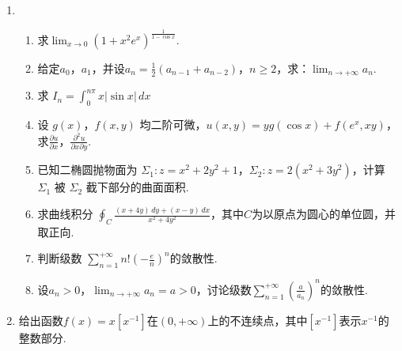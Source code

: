 \documentclass{article}
\begin{document}
\begin{enumerate}
\item
\begin{enumerate}
\item
求$\displaystyle\lim_{x\to 0}\left(1+x^2e^x\right)^{\frac{1}{1-\cos x}}$.
\item
给定$a_0$，$a_1$，并设$\displaystyle a_n=\frac{1}{2}\left(a_{n-1}+a_{n-2}\right)$，$n\ge 2$，求：$\displaystyle \lim_{n\to+\infty}a_n$.
\item
求 $\displaystyle I_n=\int_{0}^{n\pi}x|\sin x|\,dx$
\item
设 $g(x)$，$f(x,y)$ 均二阶可微，$u(x,y)=yg(\cos x)+f(e^x,xy)$，求$\displaystyle \frac{\partial u}{\partial x}$，$\displaystyle\frac{\partial^2 u}{\partial x\partial y}$.
\item
已知二椭圆抛物面为 $\Sigma_1:z=x^2+2y^2+1$，$\Sigma_2:z=2(x^2+3y^2)$，计算 $\Sigma_1$ 被 $\Sigma_2$ 截下部分的曲面面积.
\item
求曲线积分 $\displaystyle \oint_{C}\frac{(x+4y)\,dy+(x-y)\,dx}{x^2+4y^2}$，其中$C$为以原点为圆心的单位圆，并取正向.
\item
判断级数 $\displaystyle \sum_{n=1}^{+\infty}n!\left(-\frac{e}{n}\right)^n$的敛散性.
\item
设$a_n>0$，$\displaystyle \lim_{n\to+\infty}a_n=a>0$，讨论级数$\displaystyle \sum_{n=1}^{+\infty}\left(\frac{a}{a_n}\right)^n$的敛散性.
\end{enumerate}
\item
给出函数$f(x)=x[x^{-1}]$在$(0,+\infty)$上的不连续点，其中$[x^{-1}]$表示$x^{-1}$的整数部分.

\end{enumerate}
\end{document}
